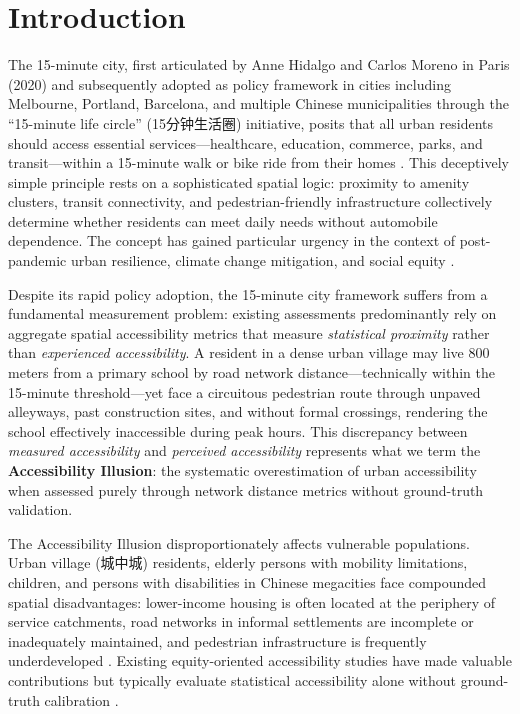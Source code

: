\documentclass[preprint,12pt,authoryear]{elsarticle}
\begin{document}
\section{Introduction}
\label{sec:introduction}

The 15-minute city, first articulated by Anne Hidalgo and Carlos Moreno in Paris (2020) and subsequently adopted as policy framework in cities including Melbourne, Portland, Barcelona, and multiple Chinese municipalities through the ``15-minute life circle'' (15分钟生活圈) initiative, posits that all urban residents should access essential services---healthcare, education, commerce, parks, and transit---within a 15-minute walk or bike ride from their homes \citep{royo2015compact, moreno202115minute}. This deceptively simple principle rests on a sophisticated spatial logic: proximity to amenity clusters, transit connectivity, and pedestrian-friendly infrastructure collectively determine whether residents can meet daily needs without automobile dependence. The concept has gained particular urgency in the context of post-pandemic urban resilience, climate change mitigation, and social equity \citep{allam2022operationalising}.

Despite its rapid policy adoption, the 15-minute city framework suffers from a fundamental measurement problem: existing assessments predominantly rely on aggregate spatial accessibility metrics that measure \emph{statistical proximity} rather than \emph{experienced accessibility}. A resident in a dense urban village may live 800 meters from a primary school by road network distance---technically within the 15-minute threshold---yet face a circuitous pedestrian route through unpaved alleyways, past construction sites, and without formal crossings, rendering the school effectively inaccessible during peak hours. This discrepancy between \emph{measured accessibility} and \emph{perceived accessibility} represents what we term the \textbf{Accessibility Illusion}: the systematic overestimation of urban accessibility when assessed purely through network distance metrics without ground-truth validation.

The Accessibility Illusion disproportionately affects vulnerable populations. Urban village (城中城) residents, elderly persons with mobility limitations, children, and persons with disabilities in Chinese megacities face compounded spatial disadvantages: lower-income housing is often located at the periphery of service catchments, road networks in informal settlements are incomplete or inadequately maintained, and pedestrian infrastructure is frequently underdeveloped \citep{buiser2012urban}. Existing equity-oriented accessibility studies have made valuable contributions but typically evaluate statistical accessibility alone without ground-truth calibration \citep{dai2010spatial, wang2012measuring, Luo2014}.
\end{document}

